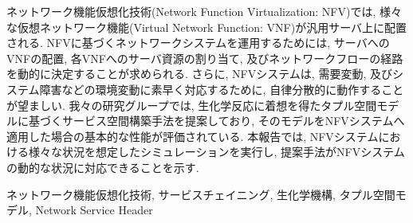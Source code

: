 \documentclass[technicalreport]{ieicej}
\begin{document}
	\begin{jabstract}
	ネットワーク機能仮想化技術(Network Function Virtualization: NFV)では, 様々な仮想ネットワーク機能(Virtual Network Function: VNF)が汎用サーバ上に配置される.
	NFVに基づくネットワークシステムを運用するためには, サーバへのVNFの配置, 各VNFへのサーバ資源の割り当て, 及びネットワークフローの経路を動的に決定することが求められる.
	さらに, NFVシステムは, 需要変動, 及びシステム障害などの環境変動に素早く対応するために, 自律分散的に動作することが望ましい.
	我々の研究グループでは, 生化学反応に着想を得たタプル空間モデルに基づくサービス空間構築手法を提案しており, そのモデルをNFVシステムへ適用した場合の基本的な性能が評価されている.
	本報告では, NFVシステムにおける様々な状況を想定したシミュレーションを実行し, 提案手法がNFVシステムの動的な状況に対応できることを示す.
	\end{jabstract}

	\begin{jkeyword}
		ネットワーク機能仮想化技術,
		サービスチェイニング,
		生化学機構,
		タプル空間モデル,
		Network Service Header
	\end{jkeyword}

	\maketitle

\end{document}
